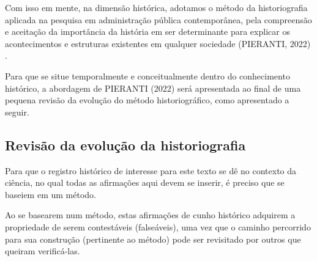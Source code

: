 \documentclass[
12pt,		%
openright,	%
twoside,  %
a4paper,			%
chapter=TITLE,		%
english,			%
french,				%
spanish,			%
brazil				%
]{USPSC-classe/USPSC_RedarTex}
\begin{document}
\noindent\begin{center}\mbox{\centering{}}\end{center}











Com isso em mente, na dimens\~ao hist\'orica, adotamos o m\'etodo da historiografia aplicada na pesquisa em administra\c{c}\~ao p\'ublica contempor\^anea, pela compreens\~ao e aceita\c{c}\~ao da import\^ancia da hist\'oria em ser determinante para explicar os acontecimentos e estruturas existentes em qualquer sociedade (PIERANTI, 2022) .








Para que se situe temporalmente e conceitualmente dentro do conhecimento hist\'orico, a abordagem de  PIERANTI (2022) ser\'a apresentada ao final de uma pequena revis\~ao da evolu\c{c}\~ao do m\'etodo historiogr\'afico, como apresentado a seguir.








\subsection[Revis\~ao da evolu\c{c}\~ao da historiografia]{Revis\~ao da evolu\c{c}\~ao da historiografia}\label{Revis\~ao da evolu\c{c}\~ao da historiografia}
Para que o registro hist\'orico de interesse para este texto se d\^e no contexto da ci\^encia, no qual todas as afirma\c{c}\~oes aqui devem se inserir, \'e preciso que se baseiem em um m\'etodo.








Ao se basearem num m\'etodo, estas afirma\c{c}\~oes de cunho hist\'orico adquirem a propriedade de serem contest\'aveis (false\'aveis), uma vez que o caminho percorrido para sua constru\c{c}\~ao (pertinente ao m\'etodo) pode ser revisitado por outros que queiram verific\'a-las.
\end{document}
